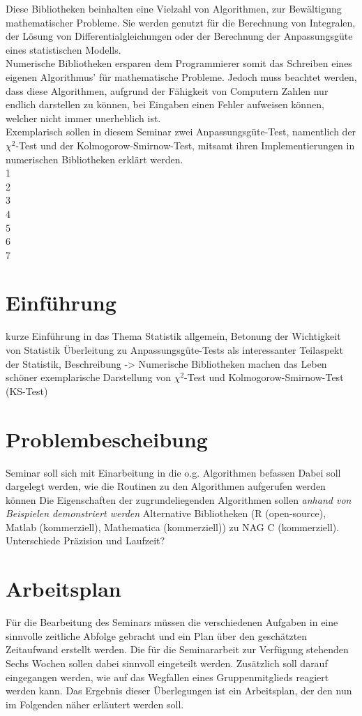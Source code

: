 \documentclass{article}
\begin{document}
Diese Bibliotheken beinhalten eine Vielzahl von Algorithmen, zur Bewältigung mathematischer Probleme. Sie werden genutzt für die Berechnung von Integralen, der Lösung von Differentialgleichungen oder der Berechnung der Anpassungsgüte eines statistischen Modells.\\
Numerische Bibliotheken ersparen dem Programmierer somit das Schreiben eines eigenen Algorithmus' für mathematische Probleme. Jedoch muss beachtet werden, dass diese Algorithmen, aufgrund der Fähigkeit von Computern Zahlen nur endlich darstellen zu können, bei Eingaben einen Fehler aufweisen können, welcher nicht immer unerheblich ist.\\
Exemplarisch sollen in diesem Seminar zwei Anpassungsgüte-Test, namentlich der $\chi^2$-Test und der Kolmogorow-Smirnow-Test, mitsamt ihren Implementierungen in numerischen Bibliotheken erklärt werden.
\\1\\
2\\
3\\
4\\
5\\
6\\
7

\newpage
\section{Einführung}
kurze Einführung in das Thema Statistik allgemein, Betonung der Wichtigkeit von Statistik
Überleitung zu Anpassungsgüte-Tests als interessanter Teilaspekt der Statistik, Beschreibung
-> Numerische Bibliotheken machen das Leben schöner
exemplarische Darstellung von $\chi^2$-Test und Kolmogorow-Smirnow-Test (KS-Test)

\section{Problembescheibung}
Seminar soll sich mit Einarbeitung in die o.g. Algorithmen befassen
Dabei soll dargelegt werden, wie die Routinen zu den Algorithmen aufgerufen werden können
Die Eigenschaften der zugrundeliegenden Algorithmen sollen \emph{anhand von Beispielen demonstriert werden}
Alternative Bibliotheken (R (open-source), Matlab (kommerziell), Mathematica (kommerziell)) zu NAG C (kommerziell).
Unterschiede Präzision und Laufzeit?

\section{Arbeitsplan}
Für die Bearbeitung des Seminars müssen die verschiedenen Aufgaben in eine sinnvolle zeitliche Abfolge gebracht und ein Plan über den geschätzten Zeitaufwand erstellt werden.
Die für die Seminararbeit zur Verfügung stehenden Sechs Wochen sollen dabei sinnvoll eingeteilt werden.
Zusätzlich soll darauf eingegangen werden, wie auf das Wegfallen eines Gruppenmitglieds reagiert werden kann.
Das Ergebnis dieser Überlegungen ist ein Arbeitsplan, der den nun im Folgenden näher erläutert werden soll.
\end{document}
